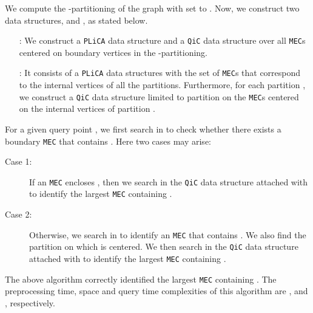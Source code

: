 \documentclass[12pt]{llncs}
\begin{document}
We compute the -partitioning of the graph  with  set to . Now, we construct two data structures,  and , as stated 
below.
\begin{itemize}
\item[:] We 
construct a {\tt PLiCA} data structure and a {\tt QiC} data structure  over all {\tt MEC}s centered on boundary vertices in the -partitioning. 
\item[:] It consists of a {\tt PLiCA} data structures with the set of {\tt MEC}s 
that correspond to the internal vertices of all the partitions.
Furthermore, for each partition , we construct a {\tt QiC} data structure limited to partition  on the {\tt MEC}s centered on the internal vertices of partition .
\end{itemize}
For a given query point , we first search in  to check whether there exists 
a boundary {\tt MEC} that contains . Here two cases may arise:
\begin{description}
\item[Case 1:]  If an {\tt MEC}  encloses , then we search in the {\tt QiC} 
data structure attached with  to identify the largest {\tt MEC} containing .
\item[Case 2:] Otherwise, we search in  to identify an {\tt MEC}  that 
contains . We also find the partition  on which  is centered. We  then search in the {\tt QiC} data structure attached with  to 
identify the largest {\tt MEC} containing .
\end{description}
\begin{lemma} 
The above algorithm correctly identified the largest {\tt MEC} containing . The 
preprocessing time, space and query time complexities of this algorithm are 
,  and , respectively. 
\end{lemma}
\end{document}
